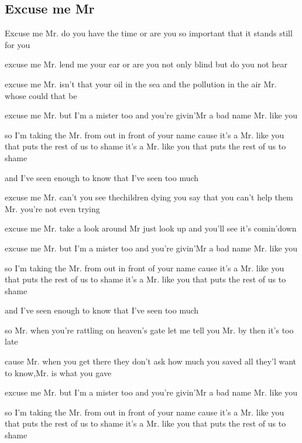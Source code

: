 \subsection*{Excuse me Mr   }
\begin{guitar}
\begin{multicols}{2}
Excuse me Mr.
do you have the time
or are you so important
that it stands still for you

excuse me Mr.
lend me your ear
or are you not only blind
but do you not hear

excuse me Mr.
isn't that your oil in the sea
and the pollution in the air Mr.
whose could that be

excuse me Mr.
but I'm a mister too
and you're givin'Mr a bad name
Mr. like you

so I'm taking the Mr.
from out in front of your name
cause it's a Mr. like you
that puts the rest of us to shame
it's a Mr. like you
that puts the rest of us to shame

and I've seen enough to know
that I've seen too much

excuse me Mr.
can't you see thechildren dying
you say that you can't help them
Mr. you're not even trying

excuse me Mr.
take a look around
Mr just look up
and you'll see it's comin'down

excuse me Mr.
but I'm a mister too
and you're givin'Mr a bad name
Mr. like you

so I'm taking the Mr.
from out in front of your name
cause it's a Mr. like you
that puts the rest of us to shame
it's a Mr. like you
that puts the rest of us to shame

and I've seen enough to know
that I've seen too much

\columnbreak
so Mr. when you're rattling
on heaven's gate
let me tell you Mr.
by then it's too late

cause Mr. when you get there
they don't ask how much you saved
all they'l want to know,Mr.
is what you gave

excuse me Mr.
but I'm a mister too
and you're givin'Mr a bad name
Mr. like you

so I'm taking the Mr.
from out in front of your name
cause it's a Mr. like you
that puts the rest of us to shame
it's a Mr. like you
that puts the rest of us to shame

\end{multicols}
\end{guitar}
